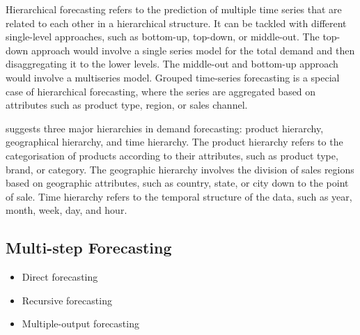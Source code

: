 %

Hierarchical forecasting refers to the prediction of multiple time series that are related to each other in a hierarchical structure\cite{hyndman2018forecasting}.
It can be tackled with different single-level approaches, such as bottom-up, top-down, or middle-out\cite{hyndman2018forecasting}.
The top-down approach would involve a single series model for the total demand and then disaggregating it to the lower levels.
The middle-out and bottom-up approach would involve a multiseries model.
Grouped time-series forecasting is a special case of hierarchical forecasting, where the series are aggregated based on attributes such as product type, region, or sales channel.

\cite{vandeput2023demand} suggests three major hierarchies in demand forecasting: product hierarchy, geographical hierarchy, and time hierarchy.
The product hierarchy refers to the categorisation of products according to their attributes, such as product type, brand, or category.
The geographic hierarchy involves the division of sales regions based on geographic attributes, such as country, state, or city down to the point of sale.
Time hierarchy refers to the temporal structure of the data, such as year, month, week, day, and hour.



\subsection{Multi-step Forecasting}
\label{sec:multi_step_forecasting}
%
\begin{itemize}
    \item Direct forecasting
    \item Recursive forecasting
    \item Multiple-output forecasting
\end{itemize}






